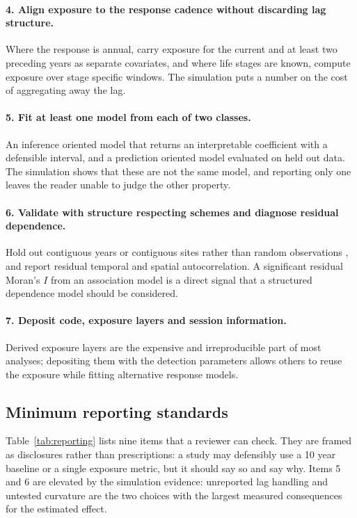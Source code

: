 \paragraph{4. Align exposure to the response cadence without discarding lag structure.}
Where the response is annual, carry exposure for the current and at least two preceding years as separate covariates, and where life stages are known, compute exposure over stage specific windows. The simulation puts a number on the cost of aggregating away the lag.

\paragraph{5. Fit at least one model from each of two classes.}
An inference oriented model that returns an interpretable coefficient with a defensible interval, and a prediction oriented model evaluated on held out data. The simulation shows that these are not the same model, and reporting only one leaves the reader unable to judge the other property.

\paragraph{6. Validate with structure respecting schemes and diagnose residual dependence.}
Hold out contiguous years or contiguous sites rather than random observations \citep{roberts2017}, and report residual temporal and spatial autocorrelation. A significant residual Moran's $I$ from an association model is a direct signal that a structured dependence model should be considered.

\paragraph{7. Deposit code, exposure layers and session information.}
Derived exposure layers are the expensive and irreproducible part of most analyses; depositing them with the detection parameters allows others to reuse the exposure while fitting alternative response models.

\subsection{Minimum reporting standards}\label{sec:reporting}

Table~\ref{tab:reporting} lists nine items that a reviewer can check. They are framed as disclosures rather than prescriptions: a study may defensibly use a 10 year baseline or a single exposure metric, but it should say so and say why. Items 5 and 6 are elevated by the simulation evidence: unreported lag handling and untested curvature are the two choices with the largest measured consequences for the estimated effect.


